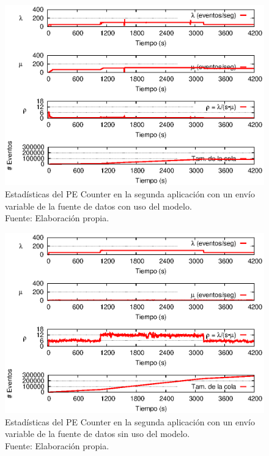 \begin{figure}[!ht]
    \centering
    \captionsetup{justification=centering}
    \includegraphics[scale=1]{images/exp/app2/normal/cm/statusCounterPE.eps}
    \caption[Estadísticas del PE Counter en la segunda aplicación con un envío variable de la fuente de datos con uso del modelo.]{Estadísticas del PE Counter en la segunda aplicación con un envío variable de la fuente de datos con uso del modelo.\\Fuente: Elaboración propia.}
    \label{fig:app2-normal-statusCounterPE-cm}
\end{figure}

\begin{figure}[!ht]
    \centering
    \captionsetup{justification=centering}
    \includegraphics[scale=1]{images/exp/app2/normal/sm/statusCounterPE.eps}
    \caption[Estadísticas del PE Counter en la segunda aplicación con un envío variable de la fuente de datos sin uso del modelo.]{Estadísticas del PE Counter en la segunda aplicación con un envío variable de la fuente de datos sin uso del modelo.\\Fuente: Elaboración propia.}
    \label{fig:app2-normal-statusCounterPE-sm}
\end{figure}

